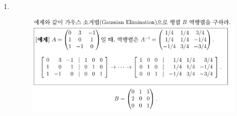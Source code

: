 \documentclass[10pt]{article}
\newcommand{\mathcolorbox}[2]{\colorbox{#1}{$\displaystyle #2$}}
\theoremstyle{definition}
\newcommand{\R}{\mathbb{R}}
\newcommand{\sol}{\textcolor{magenta}{\bf Sol}}
\renewcommand{\vec}[1]{\textbf{#1}}
\begin{document}
\begin{enumerate}[\bf 1.]
\begin{proof}[\sol]
\begin{align*}
\begin{array}{cccc|c}
			0 & 1 & 2 & -3 & 3\\
			0 & 0 & \mathcolorbox{-red}{-1} & 0 & 0\\
			0 & 0 & 0 & \mathcolorbox{-red}{-1} & 0
		\end{array}
		\right]\quad\text{Minus-1 Trick},
	\end{align*} and so \[
	\vec{x}=\begin{bmatrix}
		x_1\\x_2\\x_3\\x_4
	\end{bmatrix}=\lambda_1\begin{bmatrix}
	-1\\2\\-1\\0
\end{bmatrix}+\lambda_2\begin{bmatrix}
2\\-3\\0\\-1
\end{bmatrix}+\begin{bmatrix}
-1\\3\\0\\0
\end{bmatrix}
	\] for \(\lambda_1,\lambda_2\in\R\). Thus, all solutions are given by \[
	\set{\vec{x}\in\R^4:\vec{x}=\lambda_1\begin{bmatrix}
			-1\\2\\-1\\0
		\end{bmatrix}+\lambda_2\begin{bmatrix}
			2\\-3\\0\\-1
		\end{bmatrix}+\begin{bmatrix}
			-1\\3\\0\\0
	\end{bmatrix},\quad\lambda_1,\lambda_2\in\R}.
	\] 
\end{proof}
\newpage
\item \ \begin{figure}[h!]
	\includegraphics[scale=.35]{asgmt1_2.png}

\end{figure}
\end{enumerate}
\end{document}
